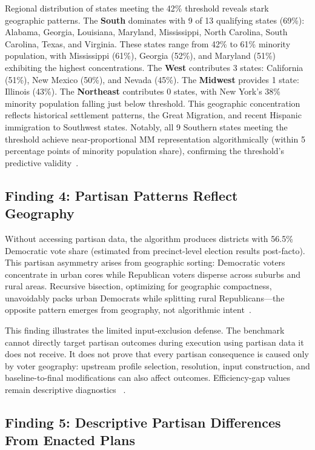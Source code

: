 Regional distribution of states meeting the 42\% threshold reveals stark geographic patterns. The \textbf{South} dominates with 9 of 13 qualifying states (69\%): Alabama, Georgia, Louisiana, Maryland, Mississippi, North Carolina, South Carolina, Texas, and Virginia. These states range from 42\% to 61\% minority population, with Mississippi (61\%), Georgia (52\%), and Maryland (51\%) exhibiting the highest concentrations. The \textbf{West} contributes 3 states: California (51\%), New Mexico (50\%), and Nevada (45\%). The \textbf{Midwest} provides 1 state: Illinois (43\%). The \textbf{Northeast} contributes 0 states, with New York's 38\% minority population falling just below threshold. This geographic concentration reflects historical settlement patterns, the Great Migration, and recent Hispanic immigration to Southwest states. Notably, all 9 Southern states meeting the threshold achieve near-proportional MM representation algorithmically (within 5 percentage points of minority population share), confirming the threshold's predictive validity~\cite{deluca2026threshold}.

\subsection{Finding 4: Partisan Patterns Reflect Geography}

Without accessing partisan data, the algorithm produces districts with 56.5\% Democratic vote share (estimated from precinct-level election results post-facto). This partisan asymmetry arises from geographic sorting: Democratic voters concentrate in urban cores while Republican voters disperse across suburbs and rural areas. Recursive bisection, optimizing for geographic compactness, unavoidably packs urban Democrats while splitting rural Republicans---the opposite pattern emerges from geography, not algorithmic intent~\cite{chen2013unintentional,deluca2026edgeweighted}.

This finding illustrates the limited input-exclusion defense. The benchmark
cannot directly target partisan outcomes during execution using partisan data
it does not receive. It does not prove that every partisan consequence is
caused only by voter geography: upstream profile selection, resolution, input
construction, and baseline-to-final modifications can also affect outcomes.
Efficiency-gap values remain descriptive diagnostics
~\cite{deluca2026edgeweighted}.

\subsection{Finding 5: Descriptive Partisan Differences From Enacted Plans}

